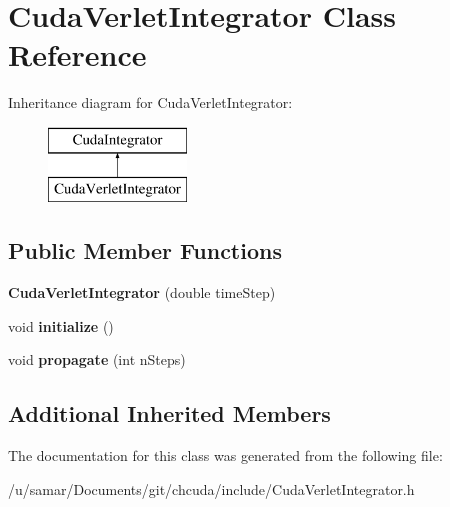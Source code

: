 \hypertarget{classCudaVerletIntegrator}{}\section{Cuda\+Verlet\+Integrator Class Reference}
\label{classCudaVerletIntegrator}
Inheritance diagram for Cuda\+Verlet\+Integrator\+:\begin{figure}[H]
\begin{center}
\leavevmode
\includegraphics[height=2.000000cm]{classCudaVerletIntegrator}
\end{center}
\end{figure}
\subsection*{Public Member Functions}
\begin{DoxyCompactItemize}
\item 
\hypertarget{classCudaVerletIntegrator_a0e92c63dd2721d38d675ac512202189b}{}\label{classCudaVerletIntegrator_a0e92c63dd2721d38d675ac512202189b} 
{\bfseries Cuda\+Verlet\+Integrator} (double time\+Step)
\item 
\hypertarget{classCudaVerletIntegrator_aab3261c7210721b4e997d2ca5c6975a0}{}\label{classCudaVerletIntegrator_aab3261c7210721b4e997d2ca5c6975a0} 
void {\bfseries initialize} ()
\item 
\hypertarget{classCudaVerletIntegrator_a0ccbad0ff553021dfb6618e9e52f4f88}{}\label{classCudaVerletIntegrator_a0ccbad0ff553021dfb6618e9e52f4f88} 
void {\bfseries propagate} (int n\+Steps)
\end{DoxyCompactItemize}
\subsection*{Additional Inherited Members}


The documentation for this class was generated from the following file\+:\begin{DoxyCompactItemize}
\item 
/u/samar/\+Documents/git/chcuda/include/Cuda\+Verlet\+Integrator.\+h\end{DoxyCompactItemize}
